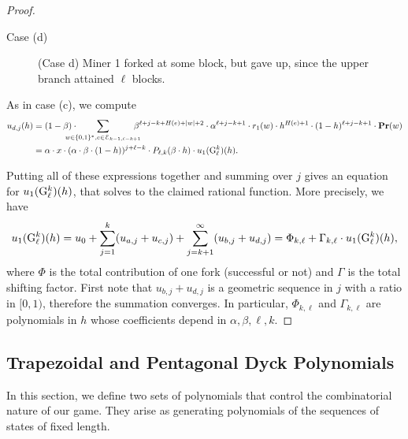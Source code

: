 \begin{proof}
\begin{subsubsection}{Case (d)}
\begin{figure}[ht!]
\caption{(Case d) Miner 1 forked at some block, but gave up, since the upper branch attained $\ell$ blocks.}
\end{figure}


As in case (c), we compute
\begin{align*}
u_{d,j}(h) &= (1-\beta) \cdot \!\!\!\!\!\!\!\!\!\sum_{w\in \bstring, e\in \Pent_{k-1, \ell-k+1}}\!\!\!\!\!\!\beta^{\ell+j-k+H(e)+|w|+2}\cdot \alpha^{\ell+j-k+1}\cdot r_1(w) \cdot h^{H(e)+1}\cdot(1-h)^{\ell+j-k+1}\cdot \pr(w)\\
        &= \alpha\cdot x\cdot(\alpha\cdot\beta\cdot(1-h))^{j+\ell-k}\cdot P_{\ell,k}(\beta\cdot h) \cdot u_1(\gup^k_\ell)(h).
\end{align*}



\end{subsubsection}

Putting all of these expressions together and summing over $j$ gives an equation for $u_1({\rm {G}}^k_\ell)(h)$, that solves to the claimed rational function. More precisely, we have
$$u_1({\rm {G}}^k_\ell)(h) = u_0 + \sum_{j=1}^k (u_{a,j} + u_{c,j}) + \sum_{j=k+1}^\infty (u_{b,j} + u_{d,j}) = \Phi_{k,\ell} + \Gamma_{k,\ell}\cdot u_1({\rm {G}}^k_\ell)(h),$$
where $\Phi$ is the total contribution of one fork (successful or not) and $\Gamma$ is the total shifting factor. First note that $u_{b,j}+u_{d,j}$ is a geometric sequence in $j$ with a ratio in $[0,1)$, therefore the summation converges. In particular, $\Phi_{k,\ell}$ and $\Gamma_{k,\ell}$ are polynomials in $h$ whose coefficients depend in $\alpha,\beta,\ell,k$.
\end{proof}

\subsection*{Trapezoidal and Pentagonal Dyck Polynomials}
\label{sec-trapezoid-pentagon}

In this section, we define two sets of polynomials that control the combinatorial nature of our game. They arise as generating polynomials of the sequences of states of fixed length. 

